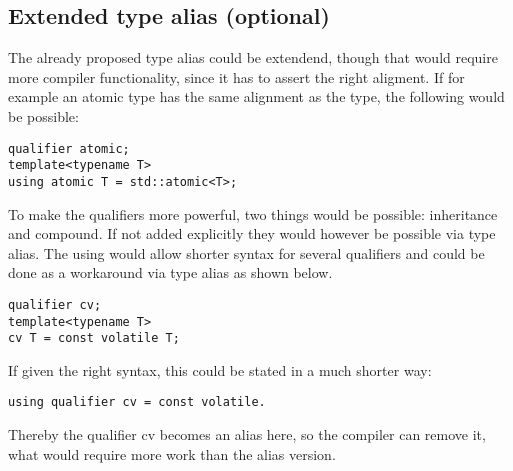 \subsection{Extended type alias (optional)}
The already proposed type alias could be extendend, though that would require more compiler functionality, since it has to assert the right aligment. If for example an atomic type has the same alignment as the type, the following would be possible:
\begin{lstlisting}
qualifier atomic;
template<typename T>
using atomic T = std::atomic<T>;
\end{lstlisting}
To make the qualifiers more powerful, two things would be possible: inheritance and compound. If not added explicitly they would however be possible via type alias. The using would allow shorter syntax for several qualifiers and could be done as a workaround via type alias as shown below.  
\begin{lstlisting}
qualifier cv;
template<typename T>
cv T = const volatile T;
\end{lstlisting}
If given the right syntax, this could be stated in a much shorter way:
\begin{lstlisting}
using qualifier cv = const volatile.
\end{lstlisting}
Thereby the qualifier cv becomes an alias here, so the compiler can remove it, what would require more work than the alias version.

